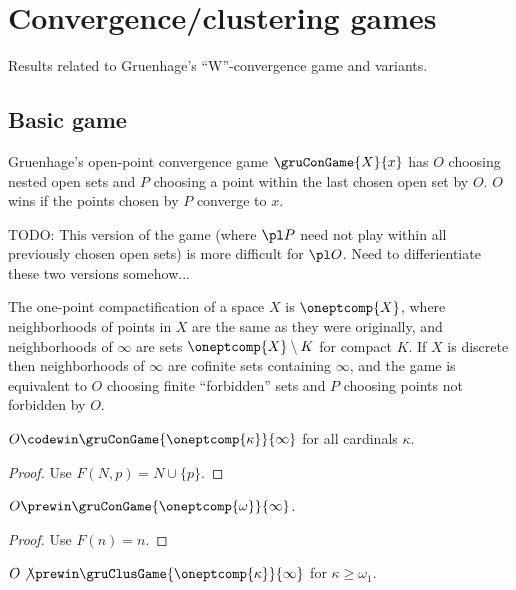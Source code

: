 \chapter{Convergence/clustering games}

Results related to Gruenhage's ``W''-convergence game and variants.

\section{Basic game}

\begin{defn}
Gruenhage's open-point convergence game $\gruConGame{X}{x}$ has $O$ choosing nested open sets and $P$ choosing a point within the last chosen open set by $O$. $O$ wins if the points chosen by $P$ converge to $x$.
\end{defn}

TODO: This version of the game (where $\pl P$ need not play within all
previously chosen open sets) is more difficult for $\pl O$. Need to
differientiate these two versions somehow...

\begin{defn}
The one-point compactification of a space $X$ is $\oneptcomp{X}$, where neighborhoods of points in $X$ are the same as they were originally, and neighborhoods of $\infty$ are sets $\oneptcomp{X}\setminus K$ for compact $K$. If $X$ is discrete then neighborhoods of $\infty$ are cofinite sets containing $\infty$, and the game is equivalent to $O$ choosing finite ``forbidden'' sets and $P$ choosing points not forbidden by $O$.
\end{defn}

\begin{prop}
$O\codewin \gruConGame{\oneptcomp{\kappa}}{\infty}$ for all cardinals $\kappa$.
\end{prop}

\begin{proof}
Use $F(N,p)=N\cup\{p\}$.
\end{proof}

\begin{prop}
$O\prewin \gruConGame{\oneptcomp{\omega}}{\infty}$.
\end{prop}

\begin{proof}
Use $F(n)=n$.
\end{proof}


\begin{prop}
$O\not\prewin \gruClusGame{\oneptcomp{\kappa}}{\infty}$ for $\kappa\geq\omega_1$.
\end{prop}

